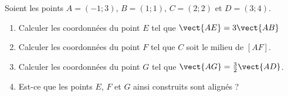 
\begin{exercice}\label{exosmath-0060}

    Soient les points \( A=(-1;3)\), \( B=(1;1)\), \( C=(2;2)\) et \( D=(3;4)\).
    \begin{enumerate}
        \item
            Calculer les coordonnées du point \( E\) tel que \( \vect{ AE }=3\vect{ AB }\)
        \item
            Calculer les coordonnées du point \( F\) tel que \( C\) soit le milieu de \( [AF]\).
        \item
            Calculer les coordonnées du point \( G\) tel que \( \vect{ AG }=\frac{ 3 }{2}\vect{ AD }\).
        \item
            Est-ce que les points \( E\), \( F\) et \( G\) ainsi construits sont alignés ?
    \end{enumerate}

\end{exercice}
